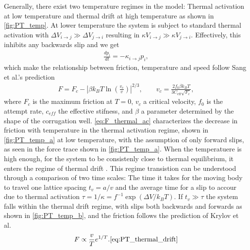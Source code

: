 Generally, there exist two temperature regimes in the model: Thermal activation at low temperature and thermal drift at high temperature as shown in \cref{fig:PT_temp}. At lower temperature the system is subject to standard thermal activation with $\Delta V_{i \to j} \gg \Delta V_{j \to i}$ resulting in  $\kappa V_{i \to j} \gg \kappa V_{j \to i}$. Effectively, this inhibits any backwards slip and we get  
\begin{align*}
  \frac{dp_i}{dt} = -\kappa_{i\to j}p_i,
\end{align*}
which make the relationship between friction, temperature and speed follow Sang et al.’s prediction \cite{Sang_2001}
\begin{align}
  F=F_c-\left|\beta k_B T \ln \left(\frac{v_c}{v}\right)\right|^{2 / 3}, \qquad v_c = \frac{2f_0\beta k_B T}{3 C_{\text{eff}} \sqrt{F_c}},
  \label{eq:F_thermal_ac}
\end{align}
where $F_c$ is the maximum friction at $T = 0$, $v_c$ a critical velocity, $f_0$
is the attempt rate, $c_{eff}$ the effective stifness, and $\beta$ a
parameter determined by the shape of the corrugation well.
\cref{eq:F_thermal_ac} characterizes the decrease in friction with temperature
in the thermal activation regime, shown in \cref{fig:PT_temp_a} at low temperature, with the assumption of only forward slips, as seen in the force trace shown in \cref{fig:PT_temp_a}. When the temperatuere is high enough, for the system to be consistenly close to thermal equilibrium, it enters the regime of thermal drift \cite{PhysRevE.71.065101}. This regime transistion can be understood through a comparison of two time scales: The time it takes for the moving body to travel one lattice spacing
$t_v = a/v$ and the average time for a slip to accour due to thermal activation
$\tau = 1/\kappa = f^{-1}\exp(\Delta V / k_BT)$. If $t_v \gg \tau$ the system falls within the thermal drift regime, with slips both backwards and forwards as shown in \cref{fig:PT_temp_b}, and the friction follows the prediction of Krylov et
al.\ \cite{Krylow_2007, PhysRevE.71.065101, Jinesh_2008}
\begin{align}
  F \propto \frac{v}{T}e^{1/T}.
  \ref{eq:PT_thermal_drift}
\end{align}





  
